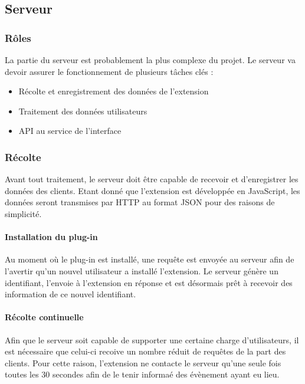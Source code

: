 	\subsection{Serveur}

		\subsubsection{Rôles}

			La partie du serveur est probablement la plus complexe du projet. Le serveur va devoir assurer le fonctionnement de plusieurs tâches clés :

			\begin{itemize}
				\item Récolte et enregistrement des données de l'extension
				\item Traitement des données utilisateurs
				\item API au service de l'interface
			\end{itemize}

		\subsubsection{Récolte}

			Avant tout traitement, le serveur doit être capable de recevoir et d'enregistrer les données des clients. Etant donné que l'extension est développée en JavaScript, les données seront transmises par HTTP au format JSON pour des raisons de simplicité.

			\paragraph{Installation du plug-in}

				Au moment où le plug-in est installé, une requête est envoyée au serveur afin de l'avertir qu'un nouvel utilisateur a installé l'extension. Le serveur génère un identifiant, l'envoie à l'extension en réponse et est désormais prêt à recevoir des information de ce nouvel identifiant.

			\paragraph{Récolte continuelle\label{d-recolte}}

				Afin que le serveur soit capable de supporter une certaine charge d'utilisateurs, il est nécessaire que celui-ci recoive un nombre réduit de requêtes de la part des clients. Pour cette raison, l'extension ne contacte le serveur qu'une seule fois toutes les 30 secondes afin de le tenir informaé des évènement ayant eu lieu.

